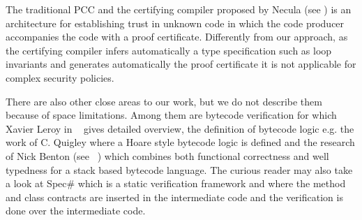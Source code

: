 
 The traditional PCC and the certifying compiler proposed by Necula (see \cite{ComNec,DesNecLee98}) is an architecture for 
 establishing trust in unknown code in which the code producer accompanies the code with a proof certificate. Differently from our approach,
  as the certifying compiler infers automatically a type specification such as loop invariants and generates automatically the proof certificate
  it is not applicable for complex security policies.

There are also other close areas to our work, but we do not describe them because of space limitations.
Among them are bytecode verification for which Xavier Leroy in  ~\cite{Ljbc} gives detailed overview, 
the definition of bytecode logic e.g. the work of C. Quigley \cite{Quigley} where a Hoare style bytecode logic is defined and
the research of Nick Benton (see ~\cite{B04tlsj}) which combines both functional correctness and well typedness for a stack based bytecode language. 
The curious reader may also take a look at Spec\# \cite{BLS04sp} which is a static verification framework and
 where the method and class contracts are inserted in the intermediate code and the verification is done over the intermediate code. 



 
